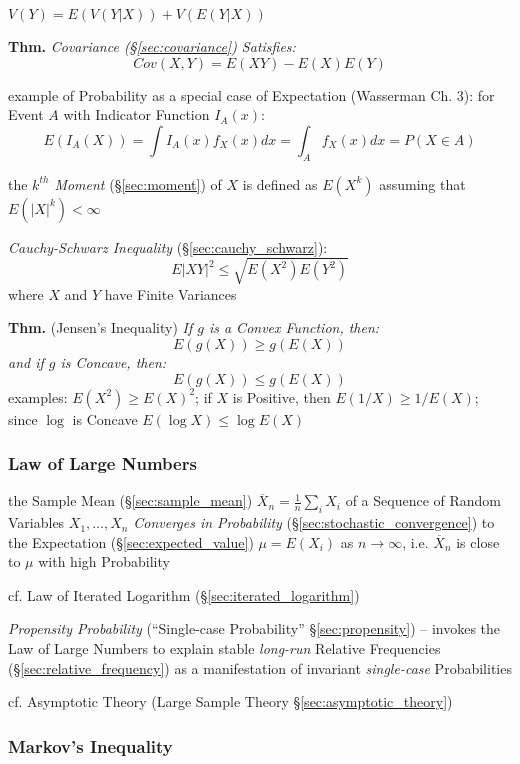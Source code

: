 $V(Y) = E(V(Y|X)) + V(E(Y|X))$

\textbf{Thm.} \emph{Covariance (\S\ref{sec:covariance}) Satisfies:
  \[
    Cov(X,Y) = E(XY) - E(X)E(Y)
  \]
}

example of Probability as a special case of Expectation (Wasserman Ch. 3): for
Event $A$ with Indicator Function $I_A(x)$:
\[
  E(I_A(X)) = \int I_A(x)f_X(x)dx = \int_A f_X(x) dx = P(X \in A)
\]

the \emph{$k^{th}$ Moment} (\S\ref{sec:moment}) of $X$ is defined as $E(X^k)$
assuming that $E(|X|^k) < \infty$

\emph{Cauchy-Schwarz Inequality} (\S\ref{sec:cauchy_schwarz}):
\[
  E|XY|^2 \leq \sqrt{E(X^2)E(Y^2)}
\]
where $X$ and $Y$ have Finite Variances

\textbf{Thm.} (Jensen's Inequality) \emph{
  If $g$ is a Convex Function, then:
  \[
    E(g(X)) \geq g(E(X))
  \]
  and if $g$ is Concave, then:
  \[
    E(g(X)) \leq g(E(X))
  \]
}
examples: $E(X^2) \geq E(X)^2$; if $X$ is Positive, then $E(1/X) \geq 1/E(X)$;
since $\log$ is Concave $E(\log X) \leq \log E(X)$



\subsubsection{Law of Large Numbers}\label{sec:large_numbers}

the Sample Mean (\S\ref{sec:sample_mean})
$\overline{X}_n = \frac{1}{n}\sum_i X_i$ of a Sequence of Random Variables
$X_1, \ldots, X_n$ \emph{Converges in Probability}
(\S\ref{sec:stochastic_convergence}) to the Expectation
(\S\ref{sec:expected_value}) $\mu = E(X_i)$ as $n \rightarrow \infty$, i.e.
$\overline{X}_n$ is close to $\mu$ with high Probability

\fist cf. Law of Iterated Logarithm (\S\ref{sec:iterated_logarithm})

\fist \emph{Propensity Probability} (``Single-case Probability''
\S\ref{sec:propensity}) -- invokes the Law of Large Numbers to explain stable
\emph{long-run} Relative Frequencies (\S\ref{sec:relative_frequency}) as a
manifestation of invariant \emph{single-case} Probabilities

\fist cf. Asymptotic Theory (Large Sample Theory \S\ref{sec:asymptotic_theory})



\subsubsection{Markov's Inequality}\label{sec:markovs_inequality}

